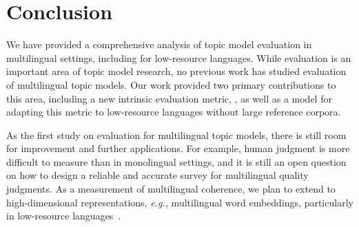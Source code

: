 \section{Conclusion}
\label{sec:conclusion}


We have provided a comprehensive analysis of topic model evaluation in multilingual settings,
including for low-resource languages.  While evaluation is an important area of topic model research,
no previous work has studied evaluation of multilingual topic models.
Our work provided two primary contributions to this area, including
a new intrinsic evaluation metric, \cnpmi{},
as well as a model for adapting this metric to low-resource languages without large reference corpora.





As the first study on evaluation for multilingual topic models,
there is still room for improvement and further applications. 
For example, human judgment is more difficult to measure than in monolingual settings,
and it is still an open question on how to design a reliable and accurate survey for multilingual quality judgments. 
As a measurement of multilingual coherence,
we plan to extend \cnpmi{} to high-dimensional representations,
\textit{e.g.,} multilingual word embeddings,
particularly in low-resource languages~\cite{Ruder17}.



